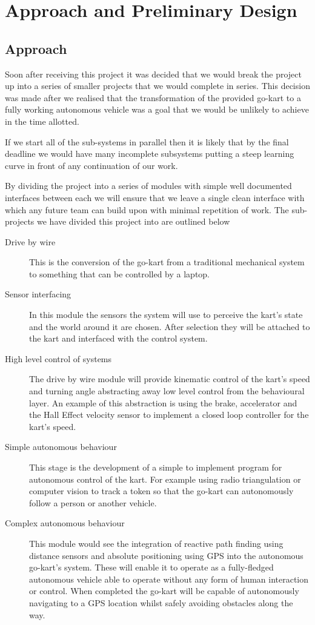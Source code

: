 \chapter{Approach and Preliminary Design}

\section{Approach}
Soon after receiving this project it was decided that we would break the project up into a series of smaller projects that we would complete in series. This decision was made after we realised that the transformation of the provided go-kart to a fully working autonomous vehicle was a goal that we would be unlikely to achieve in the time allotted.

If we start all of the sub-systems in parallel then it is likely that by the final deadline we would have many incomplete subsystems putting a steep learning curve in front of any continuation of our work.

By dividing the project into a series of modules with simple well documented interfaces between each we will ensure that we leave a single clean interface with which any future team can build upon with minimal repetition of work. The sub-projects we have divided this project into are outlined below
\begin{description}
\item[Drive by wire] This is the conversion of the go-kart from a traditional mechanical system to something that can be controlled by a laptop. 

\item[Sensor interfacing] In this module the sensors the system will use to perceive the kart's state and the world around it are chosen. After selection they will be attached to the kart and interfaced with the control system. 

\item[High level control of systems] The drive by wire module will provide kinematic control of the kart's speed and turning angle abstracting away low level control from the behavioural layer. An example of this abstraction is using the brake, accelerator and the Hall Effect velocity sensor to implement a closed loop controller for the kart's speed.  

\item[Simple autonomous behaviour] This stage is the development of a simple to implement program for autonomous control of the kart. For example using radio triangulation or computer vision to track a token so that the go-kart can autonomously follow a person or another vehicle.

\item[Complex autonomous behaviour] This module would see the integration of reactive path finding using distance sensors and absolute positioning using GPS into the autonomous go-kart's system. These will enable it to operate as a fully-fledged autonomous vehicle able to operate without any form of human interaction or control. When completed the go-kart will be capable of autonomously navigating to a GPS location whilst safely avoiding obstacles along the way.
\end{description}


